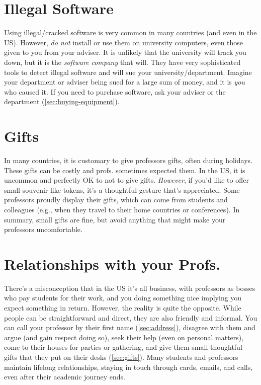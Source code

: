 \documentclass[oneside,11pt]{book}
\begin{document}
\section{Illegal Software} Using illegal/cracked software is very common in many countries (and even in the US). However, \emph{do not} install or use them on university computers, even those given to you from your adviser.  It is unlikely that the university will track you down, but it is the \emph{software company} that will.  They have very sophisticated tools to detect illegal software and will sue your university/department.  Imagine your department or adviser being sued for a large sum of money, and it is \emph{you} who caused it.  If you need to purchase software,  ask your adviser or the department (\autoref{sec:buying-equipment}).


\section{Gifts}\label{sec:gifts} In many countries, it is customary to give professors gifts, often during holidays.  These gifts can be costly and profs. sometimes expected them. In the US, it is uncommon and perfectly OK to not to give gifts. \emph{However}, if you'd like to offer small souvenir-like tokens, it's a thoughtful gesture that's appreciated. Some professors proudly display their gifts, which can come from students and colleagues (e.g., when they travel to their home countries or conferences). In summary, small gifts are fine, but avoid anything that might make your professors uncomfortable.

\section{Relationships with your Profs.}
There's a misconception that in the US it's all business, with professors as bosses who pay students for their work, and you doing something nice implying you expect something in return. However, the reality is quite the opposite. While people can be straightforward and direct, they are also friendly and informal. You can call your professor by their first name (\autoref{sec:address}), disagree with them and argue (and gain respect doing so), seek their help (even on personal matters), come to their houses for parties or gathering, and give them small thoughtful gifts that they put on their desks (\autoref{sec:gifts}).  Many students and professors maintain lifelong relationships, staying in touch through cards, emails, and calls, even after their academic journey ends. %
\end{document}
